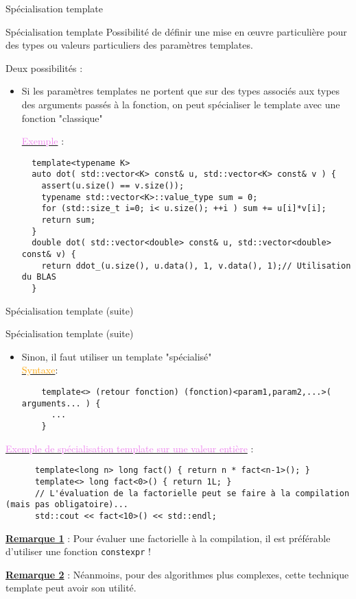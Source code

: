 \documentclass[compress,10pt,aspectratio=169]{beamer}
\begin{document}
\begin{frame}[fragile]{Spécialisation template}
    \scriptsize
    \begin{block}{\small Spécialisation template}
    Possibilité de définir une mise en {\oe}uvre particulière pour 
    des types ou valeurs particuliers des paramètres templates.
  
    Deux possibilités :
    \begin{itemize}
    \item Si les paramètres templates ne portent que sur des types associés 
          aux types des arguments passés à la fonction, on peut spécialiser
          le template avec une fonction "classique"
  
  \underline{\textcolor{violet}{Exemple}} :
  \begin{verbatim}
  template<typename K> 
  auto dot( std::vector<K> const& u, std::vector<K> const& v ) {
    assert(u.size() == v.size()); 
    typename std::vector<K>::value_type sum = 0;
    for (std::size_t i=0; i< u.size(); ++i ) sum += u[i]*v[i];
    return sum;
  }
  double dot( std::vector<double> const& u, std::vector<double> const& v) {
    return ddot_(u.size(), u.data(), 1, v.data(), 1);// Utilisation du BLAS
  }
  \end{verbatim}
  \end{itemize}
    \end{block}
  \end{frame}
  
  \begin{frame}[fragile]{Spécialisation template (suite)}
    \scriptsize
  
    \begin{block}{\small Spécialisation template (suite)}
    \begin{itemize}
      \item Sinon, il faut utiliser un template "spécialisé"\\ 
      \underline{\textcolor{orange}{Syntaxe}}:
      \begin{verbatim}
    template<> (retour fonction) (fonction)<param1,param2,...>( arguments... ) {
      ...
    }  
    \end{verbatim}
    \end{itemize}
      \underline{\textcolor{violet}{Exemple de spécialisation template sur une valeur entière}} :
      \begin{verbatim}
      template<long n> long fact() { return n * fact<n-1>(); }
      template<> long fact<0>() { return 1L; }
      // L'évaluation de la factorielle peut se faire à la compilation (mais pas obligatoire)...
      std::cout << fact<10>() << std::endl; 
      \end{verbatim}
      \textbf{\underline{Remarque 1}} : Pour évaluer une factorielle à la compilation,
      il est préférable d'utiliser une fonction \texttt{constexpr} !
    
      \textbf{\underline{Remarque 2}} : Néanmoins, pour des algorithmes plus complexes,
      cette technique template peut avoir son utilité.
    \end{block}
\end{frame}
  
\end{document}
